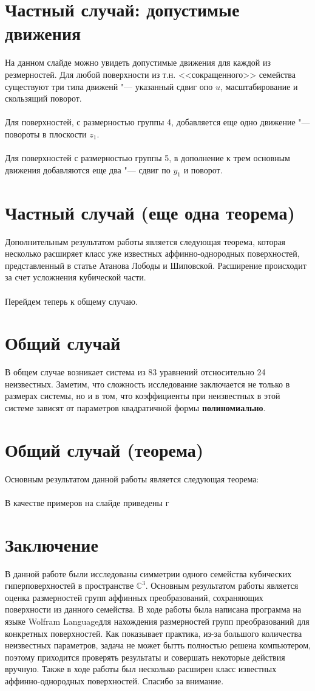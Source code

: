 \documentclass[a4paper,14pt]{extarticle}
\begin{document}
\section{Частный случай: допустимые движения}
На данном слайде можно увидеть допустимые движения для каждой из резмерностей. Для любой поверхности из т.н. <<сокращенного>> семейства существуют три типа движенй "--- указанный сдвиг опо $u$, масштабирование и скользящий поворот.
\\~\\
Для поверхностей, с размерностью группы 4, добавляется еще одно движение "--- повороты в плоскости $z_1$.
\\~\\
Для поверхностей с размерностью группы 5, в дополнение к трем основным движения добавляются еще два "--- сдвиг по $y_1$ и поворот.

\section{Частный случай (еще одна теорема)}
Дополнительным результатом работы является следующая теорема, которая несколько расширяет класс уже известных аффинно-однородных поверхностей, представленный в статье Атанова Лободы и Шиповской. Расширение происходит за счет усложнения кубической части.
\\~\\
Перейдем теперь к общему случаю.

\section{Общий случай}
В общем случае возникает система из 83 уравнений отсносительно 24 неизвестных. Заметим, что сложность исследование заключается не только в размерах системы, но и в том, что коэффициенты при неизвестных в этой системе зависят от параметров квадратичной формы \textbf{полиномиально}.

\section{Общий случай (теорема)}
Основным результатом данной работы является следующая теорема:
\\~\\
В качестве примеров на слайде приведены г

\section{Заключение}
В данной работе были исследованы симметрии одного семейства кубических гиперповерхностей в пространстве $\mathbb{C}^3$. Основным результатом работы является оценка размерностей групп аффинных преобразований, сохраняющих поверхности из данного семейства. В ходе работы была написана программа на языке {\ttfamily Wolfram Language}для нахождения размерностей групп преобразований для конкретных поверхностей. Как показывает практика, из-за большого количества неизвестных параметров, задача не может бытть полностью решена компьютером, поэтому приходится проверять результаты и совершать некоторые действия вручную. Также в ходе работы был несколько расширен класс известных аффинно-однородных поверхностей.
Спасибо за внимание.
\end{document}
